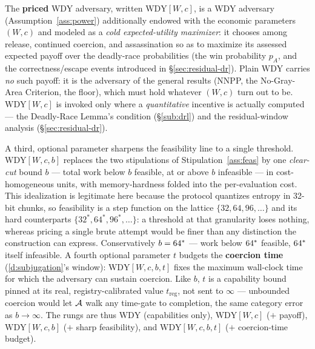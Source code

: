 \begin{definition}\label{def:priced}
The \textbf{priced} WDY adversary,
written $\mathrm{WDY}[W,c]$, is a WDY
adversary (Assumption~\ref{ass:power}) additionally endowed with the economic
parameters $(W,c)$ and modeled as a \emph{cold expected-utility maximizer}: it
chooses among release, continued coercion, and assassination so as to maximize
its assessed expected payoff over the deadly-race probabilities (the win
probability $p_A$, and the correctness/escape events introduced in
\S\ref{sec:residual-dr}). Plain $\mathrm{WDY}$
carries \emph{no} such payoff: it is the adversary of the general results (NNPP,
the No-Gray-Area Criterion, the floor), which must hold whatever
$(W,c)$ turn out to be. $\mathrm{WDY}[W,c]$ is invoked only where a
\emph{quantitative} incentive is actually computed --- the Deadly-Race Lemma's
condition (\S\ref{sub:drl}) and the residual-window analysis
(\S\ref{sec:residual-dr}).

A third, optional parameter sharpens the feasibility line to a single threshold.
$\mathrm{WDY}[W,c,b]$ replaces the two stipulations of Stipulation~\ref{ass:feas}
by one \emph{clear-cut} bound $b$ --- total work below $b$ feasible, at or above
$b$ infeasible --- in cost-homogeneous units, with memory-hardness folded into the
per-evaluation cost. This idealization is legitimate here because the protocol
quantizes entropy in 32-bit chunks, so feasibility is a step function on the
lattice $\{32, 64, 96, \dots\}$ and its hard counterparts
$\{32^{*}, 64^{*}, 96^{*}, \dots\}$: a threshold at that granularity loses
nothing, whereas pricing a single brute attempt would be finer than any
distinction the construction can express. Conservatively $b = 64^{*}$ --- work
below $64^{*}$ feasible, $64^{*}$ itself infeasible. A fourth optional parameter $t$ budgets the \textbf{coercion
time} (\ref{d:subjugation}'s window): $\mathrm{WDY}[W,c,b,t]$ fixes the maximum wall-clock time for which the
adversary can sustain coercion. Like $b$, $t$ is a capability bound pinned at its
real, registry-calibrated value $t_{\mathrm{reg}}$, not sent to $\infty$ ---
unbounded coercion would let $\mathcal{A}$ walk any time-gate to completion, the same
category error as $b\to\infty$. The rungs are thus $\mathrm{WDY}$ (capabilities
only), $\mathrm{WDY}[W,c]$ ($+$ payoff), $\mathrm{WDY}[W,c,b]$ ($+$ sharp
feasibility), and $\mathrm{WDY}[W,c,b,t]$ ($+$ coercion-time budget).
\end{definition}

